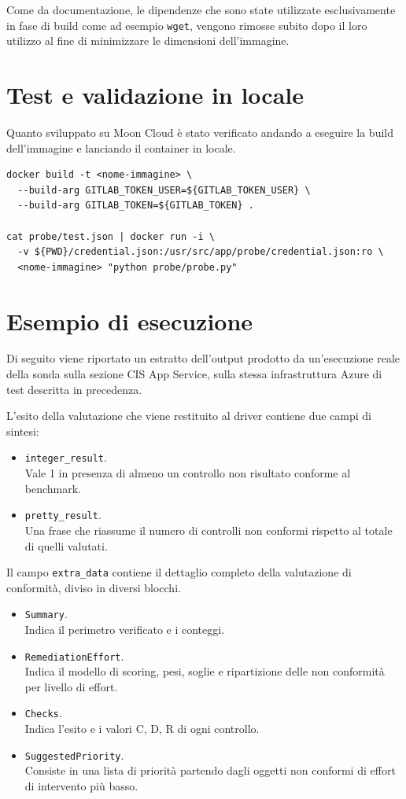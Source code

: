 \documentclass[a4paper,11pt]{report}
\begin{document}
Come da documentazione, le dipendenze che sono state utilizzate esclusivamente in fase di build come ad esempio \texttt{wget}, vengono rimosse subito dopo il loro utilizzo al fine di minimizzare le dimensioni dell'immagine.

\section{Test e validazione in locale}

Quanto sviluppato su Moon Cloud è stato verificato andando a eseguire la build dell'immagine e lanciando il container in locale.

\begin{lstlisting}[style=azcli, caption={Build ed esecuzione locale della sonda.}, label={lst:docker-run}]
docker build -t <nome-immagine> \
  --build-arg GITLAB_TOKEN_USER=${GITLAB_TOKEN_USER} \
  --build-arg GITLAB_TOKEN=${GITLAB_TOKEN} .

cat probe/test.json | docker run -i \
  -v ${PWD}/credential.json:/usr/src/app/probe/credential.json:ro \
  <nome-immagine> "python probe/probe.py"
\end{lstlisting}


\section{Esempio di esecuzione}

Di seguito viene riportato un estratto dell'output prodotto da un'esecuzione reale della sonda sulla sezione CIS App Service, sulla stessa infrastruttura Azure di test descritta in precedenza.

L'esito della valutazione che viene restituito al driver contiene due campi di sintesi: 
\begin{itemize}
\item \texttt{integer\_result}.\\
Vale 1 in presenza di almeno un controllo non risultato conforme al benchmark.
\item \texttt{pretty\_result}.\\
Una frase che riassume il numero di controlli non conformi rispetto al totale di quelli valutati.
\end{itemize}

Il campo \texttt{extra\_data} contiene il dettaglio completo della valutazione di conformità, diviso in diversi blocchi.
\begin{itemize}
\item \texttt{Summary}.\\
Indica il perimetro verificato e i conteggi.
\item \texttt{RemediationEffort}.\\
Indica il modello di scoring, pesi, soglie e ripartizione delle non conformità per livello di effort.
\item \texttt{Checks}.\\
Indica l'esito e i valori C, D, R di ogni controllo. 
\item \texttt{SuggestedPriority}.\\
Consiste in una lista di priorità partendo dagli oggetti non conformi di effort di intervento più basso.
\end{itemize}
\end{document}
